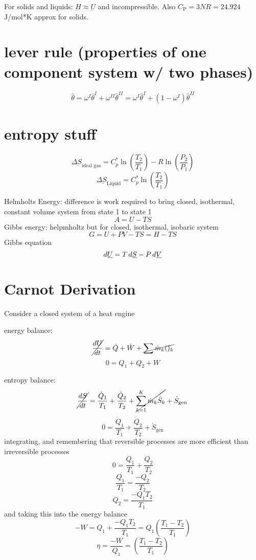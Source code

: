 \documentclass{article}
\begin{document}
For solids and liquids: $\underbar{H} \approx \underbar{U}$ and incompressible. Also $C_{\text{P}} = 3NR = 24.924$ J/mol*K approx for solids.

\section*{lever rule (properties of one component system w/ two phases)}
\[ \hat{\theta} = \omega^I \hat{\theta}^I + \omega^{II}\hat{\theta}^{II} = \omega^I \hat{\theta}^I + (1 - \omega^I)\hat{\theta}^{II} \]

\section*{entropy stuff}
\[
    \Delta \underbar{S}_{\text{ideal gas}} = C_p^* \ln \left( \frac{T_2}{T_1} \right) - R \ln \left( \frac{P_2}{P_1} \right)
\]
\[
    \Delta \underbar{S}_{\text{Liquid}} = C_p^* \ln \left( \frac{T_2}{T_1} \right) 
\]

Helmholts Energy: difference is work required to bring closed, isothermal, constant volume system from state 1 to state 1
\[ A = U - TS\]
Gibbs energy: helpmholtz but for closed, isothermal, isobaric system
\[ G = U + PV - TS = H - TS\]
Gibbs equation
\[ d\underbar{$U$} = T\,d\underbar{$S$} - P\,d\underbar{$V$}\]

\section{Carnot Derivation}
Consider a closed system of a heat engine
\begin{center}
\end{center}
energy balance:
\[ \cancel{\frac{dU}{dt}} = \dot{Q} + \dot{W} + \cancel{\sum \dot{m}_k()_k} \]
\[ 0 = Q_1 + Q_2 + W\]

entropy balance:
\[ \cancel{\frac{dS}{dt}} = \frac{\dot{Q}_1}{T_1} + \frac{\dot{Q}_2}{T_2} + \cancel{\sum_{k=1}^{K}\dot{m}_k \hat{S}_k} + \dot{S}_{\text{gen}} \]
\[ 0 = \frac{\dot{Q}_1}{T_1} + \frac{\dot{Q}_2}{T_2}  + \dot{S}_{\text{gen}} \]
integrating, and remembering that reversible processes are more efficient than irreversible processes
\[ 0 = \frac{Q_1}{T_1} + \frac{Q_2}{T_2} \]
\[ \frac{Q_1}{T_1} = \frac{- Q_2}{T_2} \]
\[ Q_2 = \frac{- Q_1 T_2}{T_1} \]
and taking this into the energy balance
\[ -W = Q_1 + \frac{- Q_1 T_2}{T_1} = Q_1 \left(\frac{T_1 - T_2}{T_1}\right) \]
\[ \eta = \frac{-W}{Q_1} = \left(\frac{T_1 - T_2}{T_1}\right) \]
\end{document}
